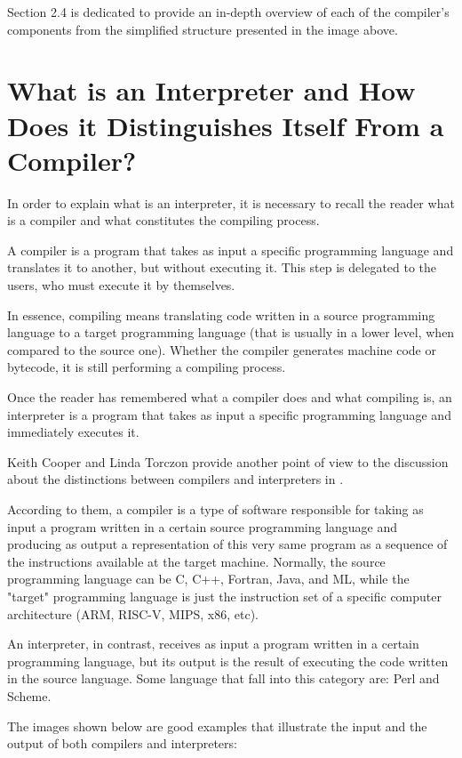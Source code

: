 Section 2.4 is dedicated to provide an in-depth overview of each of the compiler's components from the simplified structure presented in the image above.


\section{What is an Interpreter and How Does it Distinguishes Itself From a Compiler?}
In order to explain what is an interpreter, it is necessary to recall the reader what is a compiler and what constitutes the compiling process.

A compiler is a program that takes as input a specific programming language and translates it to another, but without executing it. This step is delegated to the users, who must execute it by themselves.

In essence, compiling means translating code written in a source programming language to a target programming language (that is usually in a lower level, when compared to the source one). Whether the compiler generates machine code or bytecode, it is still performing a compiling process.

Once the reader has remembered what a compiler does and what compiling is, an interpreter is a program that takes as input a specific programming language and immediately executes it.

Keith Cooper and Linda Torczon provide another point of view to the discussion about the distinctions between compilers and interpreters in \cite{cooper2022engineering}.

According to them, a compiler is a type of software responsible for taking as input a program written in a certain source programming language and producing as output a representation of this very same program as a sequence of the instructions available at the target machine. Normally, the source programming language can be C, C++, Fortran, Java, and ML, while the "target" programming language is just the instruction set of a specific computer architecture (ARM, RISC-V, MIPS, x86, etc).

An interpreter, in contrast, receives as input a program written in a certain programming language, but its output is the result of executing the code written in the source language. Some language that fall into this category are: Perl and Scheme.

The images shown below are good examples that illustrate the input and the output of both compilers and interpreters:

